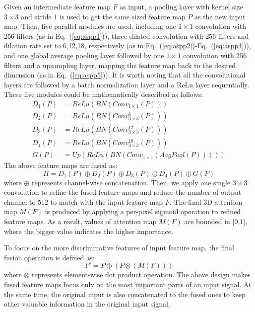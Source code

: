 \documentclass[journal]{IEEEtran}
\renewcommand{\eqref}[1]{Eq.~(\ref{#1})}
\begin{document}
Given an intermediate feature map $F$ as input, a pooling layer with kernel size $3\times3$ and stride 1 is used to get the same sized feature map $P$ as the new input map. Then, five parallel modules are used, including one $1\times1$ convolution with 256 filters (as in \eqref{eq:aspp1}), three dilated convolution with 256 filters and dilation rate set to 6,12,18, respectively (as in \eqref{eq:aspp2}-\eqref{eq:aspp4}), and one global average pooling layer followed by one $1\times1$ convolution with 256 filters and a upsampling layer, mapping the feature map back to the desired dimension (as in \eqref{eq:aspp5}).
It is worth noting that all the convolutional layers are followed by a batch normalization layer and a ReLu layer sequentially. These five modules could be mathematically described as follows:
\begin{align}
 \label{eq:aspp1} D_1(P) &= ReLu(BN(Conv_{1\times1}(P)))\\
\label{eq:aspp2}  D_2(P) &= ReLu(BN(Conv_{3\times3}^{6}(P)))\\
\label{eq:aspp3}  D_3(P) &= ReLu(BN(Conv_{3\times3}^{12}(P)))\\
 \label{eq:aspp4} D_4(P) &= ReLu(BN(Conv_{3\times3}^{18}(P)))\\
 \label{eq:aspp5} G(P) &= Up(ReLu(BN(Conv_{1\times1}({AvgPool(P)}))))
\end{align}
The above feature maps are fused as:
\begin{equation}\label{eq:aspp6}
H= D_1(P)\oplus D_2(P) \oplus D_3(P) \oplus D_4(P) \oplus G(P)
\end{equation}
where $\oplus$ represents channel-wise concatenation. Then, we apply one single $3\times3$ convolution to refine the fused feature maps and reduce the number of output channel to 512 to match with the input feature map $F$. The final 3D attention map $M(F)$ is produced by applying a per-pixel sigmoid operation to refined feature maps. As a result, values of attention map $M(F)$ are bounded in [0,1], where the bigger value indicates the higher importance.

To focus on the more discriminative features of input feature map, the final fusion operation is defined as:
\begin{equation}\label{eq:aspp7}
F'=P\oplus(P\otimes(M(F)))
\end{equation}
where $\otimes$ represents element-wise dot product operation. The above design makes fused feature maps focus only on the most important parts of an input signal. At the same time, the original input is also concatenated to the fused ones to keep other valuable information in the original input signal.
\end{document}
